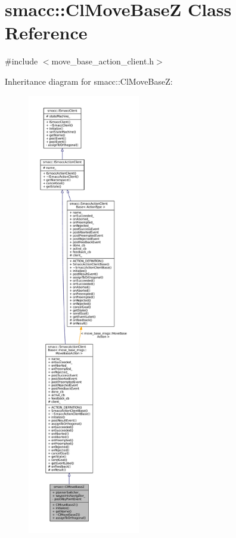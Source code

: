 \hypertarget{classsmacc_1_1ClMoveBaseZ}{}\section{smacc\+:\+:Cl\+Move\+BaseZ Class Reference}
\label{classsmacc_1_1ClMoveBaseZ}


{\ttfamily \#include $<$move\+\_\+base\+\_\+action\+\_\+client.\+h$>$}



Inheritance diagram for smacc\+:\+:Cl\+Move\+BaseZ\+:
\nopagebreak
\begin{figure}[H]
\begin{center}
\leavevmode
\includegraphics[height=550pt]{classsmacc_1_1ClMoveBaseZ__inherit__graph}
\end{center}
\end{figure}


